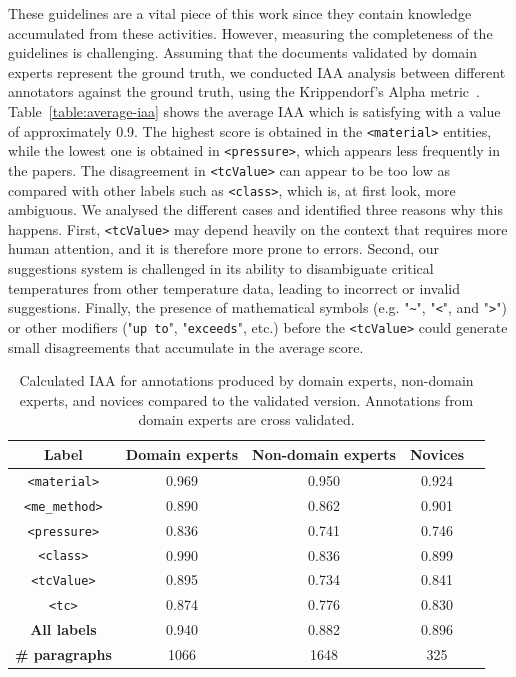 These guidelines are a vital piece of this work since they contain knowledge accumulated from these activities.
However, measuring the completeness of the guidelines is challenging. 
Assuming that the documents validated by domain experts represent the ground truth, we conducted IAA analysis between different annotators against the ground truth, using the Krippendorf's Alpha metric~\cite{Krippendorff2004ReliabilityIC}.
Table~\ref{table:average-iaa} shows the average IAA which is satisfying with a value of approximately 0.9. 
The highest score is obtained in the \texttt{<material>} entities, while the lowest one is obtained in \texttt{<pressure>}, which appears less frequently in the papers. 
The disagreement in \texttt{<tcValue>} can appear to be too low as compared with other labels such as \texttt{<class>}, which is, at first look, more ambiguous. 
We analysed the different cases and identified three reasons why this happens. 
First, \texttt{<tcValue>} may depend heavily on the context that requires more human attention, and it is therefore more prone to errors. 
Second, our suggestions system is challenged in its ability to disambiguate critical temperatures from other temperature data, leading to incorrect or invalid suggestions. 
Finally, the presence of mathematical symbols (e.g. "\texttt{\~}", "\texttt{<}", and "\texttt{>}") or other modifiers ("\texttt{up to}", "\texttt{exceeds}", etc.) before the \texttt{<tcValue>} could generate small disagreements that accumulate in the average score. 

\begin{table}[ht]
     \caption{Calculated IAA for annotations produced by domain experts, non-domain experts, and novices compared to the validated version. Annotations from domain experts are cross validated. }
    \begin{tabular}{ ccccc } 
    \toprule
        \textbf{Label} & \textbf{Domain experts} & \textbf{Non-domain experts} & \textbf{Novices}\\
    \midrule
        \texttt{<material>}     &   0.969   & 0.950    &   0.924   \\
        \texttt{<me\_method>}   &   0.890   & 0.862    &   0.901   \\
        \texttt{<pressure>}     &   0.836   & 0.741    &   0.746   \\
        \texttt{<class>}        &   0.990   & 0.836	   &   0.899   \\
        \texttt{<tcValue>}      &   0.895   & 0.734	   &   0.841   \\
        \texttt{<tc>}           &   0.874   & 0.776	   &   0.830   \\
    \midrule
        \textbf{All labels}        &	0.940   &   0.882	&      0.896   \\
    \midrule
        \textbf{\# paragraphs}  &   1066   &  1648	    &   325     \\
    \bottomrule
    \end{tabular}
   
    \label{table:comparison-iaa-nde-de}
\end{table}

